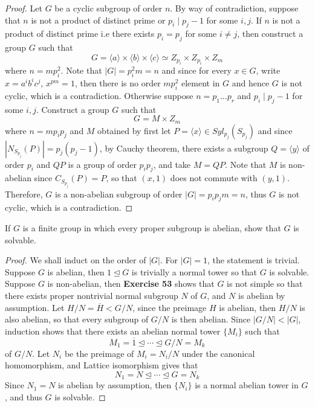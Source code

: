 \documentclass{article}
\newenvironment{problem}[2][Problem]{\begin{trivlist}
\item[\hskip \labelsep {\bfseries #1}\hskip \labelsep {\bfseries #2.}]}{\end{trivlist}}
\begin{document}
\begin{proof}
    Let $G$ be a cyclic subgroup of order $n$. By way of contradiction, suppose that $n$ is not a product of distinct prime or $p_i \mid p_j-1$ for some $i, j$.
    If $n$ is not a product of distinct prime i.e there exists $p_i = p_j$ for some $i\neq j$, then construct a group $G$ such that 
    \[
        G=\langle a \rangle \times \langle b \rangle \times \langle c \rangle\simeq Z_{p_i}\times Z_{p_i} \times Z_m
    \]
    where $n=mp_i^2$. Note that $|G|=p_i^2m=n$ and since for every $x\in G$, write $x =a^ib^ic^j$, $x^{pm}=1$, then there is no order $mp_i^2$ element in $G$ and hence $G$ is not cyclic, which is a contradiction.
    Otherwise suppose $n=p_1\dots p_r$ and $p_i\mid p_j-1$ for some $i, j$. Construct a group $G$ such that 
    \[
        G=M\times Z_m
    \]
    where $n=mp_ip_j$ and $M$ obtained by first let $P=\langle x \rangle\in Syl_{p_j}(S_{p_j})$ and since $|N_{S_{p_j}}(P)|=p_j(p_j-1)$, by Cauchy theorem, there exists a subgroup $Q=\langle y \rangle$ of order $p_i$ and $QP$ is a group of order $p_ip_j$, and take $M=QP$. Note that $M$ is non-abelian since $C_{S_{p_j}}(P)=P$, so that $(x, 1)$ does not commute with $(y, 1)$. Therefore, $G$ is a non-abelian subgroup of order $|G|=p_ip_jm=n$, thus $G$ is not cyclic, which is a contradiction.
\end{proof}
\begin{problem}{56}
         If $G$ is a finite group in which every proper subgroup is abelian, show that $G$ is solvable.
\end{problem}
\begin{proof}
    We shall induct on the order of $|G|$. For $|G|=1$, the statement is trivial. 
    Suppose $G$ is abelian, then $1 \trianglelefteq G$ is trivially a normal tower so that $G$ is solvable. Suppose $G$ is non-abelian, then \textbf{Exercise 53} shows that $G$ is not simple so that there exists proper nontrivial normal subgroup $N$ of $G$, and $N$ is abelian by assumption. Let $H/N=\overline{H}< G/N$, since the preimage $H$ is abelian, then $H/N$ is also abelian, so that every subgroup of $G/N$ is then abelian. Since $|G/N|<|G|$, induction shows that there exists an abelian normal tower $\{M_i\}$ such that 
    \[M_1=\overline{1}\trianglelefteq \cdots \trianglelefteq G/N=M_k\]
    of $G/N$. Let $N_i$ be the preimage of $M_i=N_i/N$ under the canonical homomorphism, and Lattice isomorphism gives that 
    \[
        N_1=N\trianglelefteq \cdots \trianglelefteq G=N_k
    \]
    Since $N_1=N$ is abelian by assumption, then $\{N_i\}$ is a normal abelian tower in $G$, and thus $G$ is solvable.
\end{proof}
\end{document}
